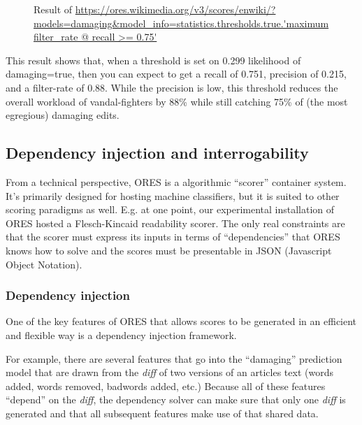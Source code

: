\begin{figure}[htbp]
        \caption{Result of \url{https://ores.wikimedia.org/v3/scores/enwiki/?models=damaging\&model\_info=statistics.thresholds.true.'maximum filter\_rate @ recall >= 0.75'}}
        \label{fig:english_damaging_threshold_optimization}
\end{figure}

This result shows that, when a threshold is set on 0.299 likelihood of damaging=true, then you can expect to get a recall of 0.751, precision of 0.215, and a filter-rate of 0.88.  While the precision is low, this threshold reduces the overall workload of vandal-fighters by 88\% while still catching 75\% of (the most egregious) damaging edits.

\subsection{Dependency injection and interrogability}
From a technical perspective, ORES is a algorithmic ``scorer'' container system.  It's primarily designed for hosting machine classifiers, but it is suited to other scoring paradigms as well.  E.g. at one point, our experimental installation of ORES hosted a Flesch-Kincaid readability scorer.  The only real constraints are that the scorer must express its inputs in terms of ``dependencies'' that ORES knows how to solve and the scores must be presentable in JSON (Javascript Object Notation).

\subsubsection{Dependency injection}
One of the key features of ORES that allows scores to be generated in an efficient and flexible way is a dependency injection framework.

For example, there are several features that go into the ``damaging'' prediction model that are drawn from the \emph{diff} of two versions of an articles text (words added, words removed, badwords added, etc.)  Because all of these features ``depend'' on the \emph{diff}, the dependency solver can make sure that only one \emph{diff} is generated and that all subsequent features make use of that shared data.

